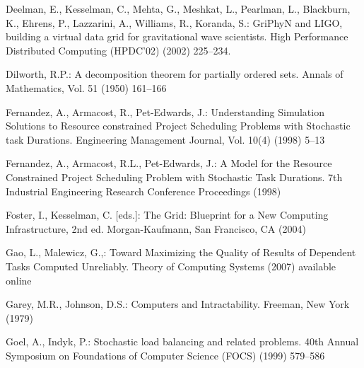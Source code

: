 \documentclass[letterpaper,11pt]{article}
\newcommand{\remove}[1]{}
\begin{document}
\begin{thebibliography}{99}
Deelman, E., Kesselman, C., Mehta, G.,  Meshkat, L., Pearlman, L., Blackburn, K., Ehrens, P., Lazzarini, A., Williams, R., Koranda, S.: 
GriPhyN and LIGO, building a virtual data grid for gravitational wave scientists.
High Performance Distributed Computing (HPDC'02) (2002) 225--234. 

Dilworth, R.P.:
A decomposition theorem for partially ordered sets.
Annals of Mathematics, Vol. 51 (1950) 161--166

\remove{
\bibitem{EN86}
Elsayed, E.A., Nasr, N.Z.:
Heuristics for resource-constrained scheduling.
International Journal of Production Research, Vol. 24(2) (1986) 299--310
}

\remove{************
\bibitem{FM96}
Farach, M., Muthukrishnan, S.:
Perfect Hashing for Strings: Formalization and Algorithms.
Combinatorial Pattern Matching (1996) 130--140
************}

Fernandez, A., Armacost, R., Pet-Edwards, J.:
Understanding Simulation Solutions to Resource constrained Project Scheduling Problems with Stochastic task Durations.
Engineering Management Journal, Vol. 10(4) (1998) 5--13

Fernandez, A., Armacost, R.L., Pet-Edwards, J.:
A Model for the Resource Constrained Project Scheduling Problem with Stochastic Task Durations.
7th Industrial Engineering Research Conference Proceedings
(1998)

Foster, I., Kesselman, C. [eds.]:
The Grid: Blueprint for a New Computing Infrastructure, 2nd
ed.
Morgan-Kaufmann, San Francisco, CA (2004)

\remove{************
\bibitem{FKS84}
Fredman, M.L., Koml\'{o}s, J., Szemer\'{e}di, E.:
Storing a sparse table with O(1) worst case access time.
Journal of the ACM, Vol. 31(3) (1984) 538--544
************}

Gao, L., Malewicz, G.,: Toward Maximizing the Quality of Results of Dependent Tasks Computed Unreliably. Theory of Computing Systems (2007) available online

Garey, M.R., Johnson, D.S.: 
Computers and Intractability.  
Freeman, New York (1979) 

\remove{************
\bibitem{Graphviz}
Graphviz - Graph Visualization Software, AT\&T Research {\small\url{http://www.graphviz.org}} 
************}

Goel, A., Indyk, P.:
Stochastic load balancing and related problems.
40th Annual Symposium on Foundations of Computer Science (FOCS) (1999) 579--586


\end{thebibliography}
\end{document}
